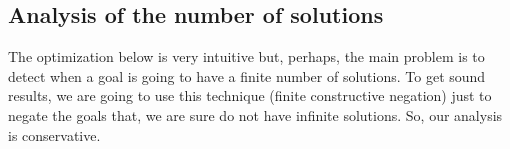 \documentclass{llncs}
\newcommand{\entails}{\models}
\newcommand{\vecy}{\overline{y}}
\begin{document}






\vspace{-0.1in}

\subsection{Analysis of the number of solutions}
\label{cneg:finite_analysis}

The optimization below is very intuitive but, perhaps, the main
problem is to detect when a goal is going to have a finite number of
solutions. To get sound results, we are going to use this technique
(finite constructive negation) just to negate the goals that, we are
sure do not have infinite solutions. So, our analysis is conservative.
\end{document}
